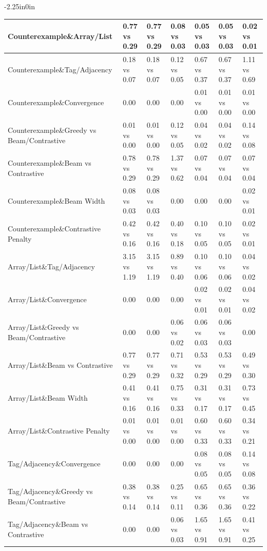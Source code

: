 \begin{table}[h]
\begin{adjustwidth}{-2.25in}{0in}
{\begin{tabular}{|l|lll|lll|}
\hline
Counterexample\&Array/List & 0.77 vs 0.29 & 0.77 vs 0.29 & 0.08 vs 0.03 & 0.05 vs 0.03 & 0.05 vs 0.03 & 0.02 vs 0.01 \\
\hline
Counterexample\&Tag/Adjacency & 0.18 vs 0.07 & 0.18 vs 0.07 & 0.12 vs 0.05 & 0.67 vs 0.37 & 0.67 vs 0.37 & 1.11 vs 0.69 \\
\hline
Counterexample\&Convergence & 0.00 & 0.00 & 0.00 & 0.01 vs 0.00 & 0.01 vs 0.00 & 0.01 vs 0.00 \\
\hline
Counterexample\&Greedy vs Beam/Contrastive & 0.01 vs 0.00 & 0.01 vs 0.00 & 0.12 vs 0.05 & 0.04 vs 0.02 & 0.04 vs 0.02 & 0.14 vs 0.08 \\
\hline
Counterexample\&Beam vs Contrastive & 0.78 vs 0.29 & 0.78 vs 0.29 & 1.37 vs 0.62 & 0.07 vs 0.04 & 0.07 vs 0.04 & 0.07 vs 0.04 \\
\hline
Counterexample\&Beam Width & 0.08 vs 0.03 & 0.08 vs 0.03 & 0.00 & 0.00 & 0.00 & 0.02 vs 0.01 \\
\hline
Counterexample\&Contrastive Penalty & 0.42 vs 0.16 & 0.42 vs 0.16 & 0.40 vs 0.18 & 0.10 vs 0.05 & 0.10 vs 0.05 & 0.02 vs 0.01 \\
\hline
Array/List\&Tag/Adjacency & 3.15 vs 1.19 & 3.15 vs 1.19 & 0.89 vs 0.40 & 0.10 vs 0.06 & 0.10 vs 0.06 & 0.04 vs 0.02 \\
\hline
Array/List\&Convergence & 0.00 & 0.00 & 0.00 & 0.02 vs 0.01 & 0.02 vs 0.01 & 0.04 vs 0.02 \\
\hline
Array/List\&Greedy vs Beam/Contrastive & 0.00 & 0.00 & 0.06 vs 0.02 & 0.06 vs 0.03 & 0.06 vs 0.03 & 0.00 \\
\hline
Array/List\&Beam vs Contrastive & 0.77 vs 0.29 & 0.77 vs 0.29 & 0.71 vs 0.32 & 0.53 vs 0.29 & 0.53 vs 0.29 & 0.49 vs 0.30 \\
\hline
Array/List\&Beam Width & 0.41 vs 0.16 & 0.41 vs 0.16 & 0.75 vs 0.33 & 0.31 vs 0.17 & 0.31 vs 0.17 & 0.73 vs 0.45 \\
\hline
Array/List\&Contrastive Penalty & 0.01 vs 0.00 & 0.01 vs 0.00 & 0.01 vs 0.00 & 0.60 vs 0.33 & 0.60 vs 0.33 & 0.34 vs 0.21 \\
\hline
Tag/Adjacency\&Convergence & 0.00 & 0.00 & 0.00 & 0.08 vs 0.05 & 0.08 vs 0.05 & 0.14 vs 0.08 \\
\hline
Tag/Adjacency\&Greedy vs Beam/Contrastive & 0.38 vs 0.14 & 0.38 vs 0.14 & 0.25 vs 0.11 & 0.65 vs 0.36 & 0.65 vs 0.36 & 0.36 vs 0.22 \\
\hline
Tag/Adjacency\&Beam vs Contrastive & 0.00 & 0.00 & 0.06 vs 0.03 & 1.65 vs 0.91 & 1.65 vs 0.91 & 0.41 vs 0.25 \\

\end{tabular}}
\end{adjustwidth}
\end{table}
